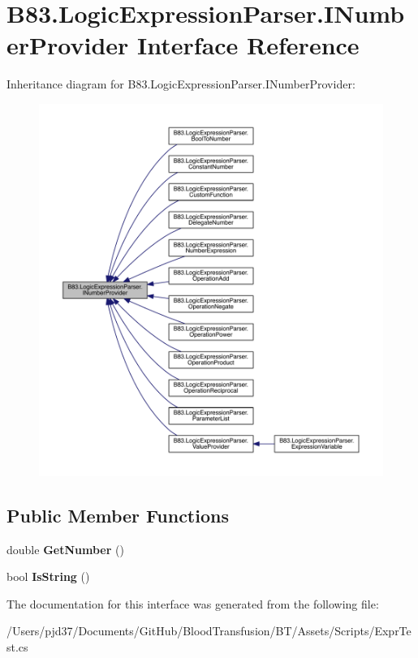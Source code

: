 \hypertarget{interface_b83_1_1_logic_expression_parser_1_1_i_number_provider}{}\section{B83.\+Logic\+Expression\+Parser.\+I\+Number\+Provider Interface Reference}
\label{interface_b83_1_1_logic_expression_parser_1_1_i_number_provider}


Inheritance diagram for B83.\+Logic\+Expression\+Parser.\+I\+Number\+Provider\+:\nopagebreak
\begin{figure}[H]
\begin{center}
\leavevmode
\includegraphics[width=350pt]{interface_b83_1_1_logic_expression_parser_1_1_i_number_provider__inherit__graph}
\end{center}
\end{figure}
\subsection*{Public Member Functions}
\begin{DoxyCompactItemize}
\item 
double {\bfseries Get\+Number} ()\hypertarget{interface_b83_1_1_logic_expression_parser_1_1_i_number_provider_a8b2188113ed07f615ea487617b7347af}{}\label{interface_b83_1_1_logic_expression_parser_1_1_i_number_provider_a8b2188113ed07f615ea487617b7347af}

\item 
bool {\bfseries Is\+String} ()\hypertarget{interface_b83_1_1_logic_expression_parser_1_1_i_number_provider_afbdb967f56f49fb365d0d6216771ba93}{}\label{interface_b83_1_1_logic_expression_parser_1_1_i_number_provider_afbdb967f56f49fb365d0d6216771ba93}

\end{DoxyCompactItemize}


The documentation for this interface was generated from the following file\+:\begin{DoxyCompactItemize}
\item 
/\+Users/pjd37/\+Documents/\+Git\+Hub/\+Blood\+Transfusion/\+B\+T/\+Assets/\+Scripts/Expr\+Test.\+cs\end{DoxyCompactItemize}
